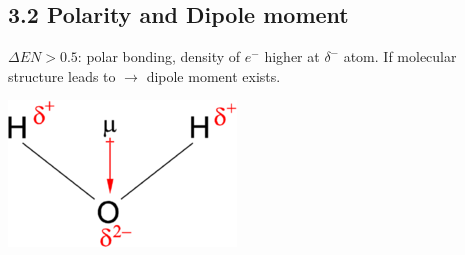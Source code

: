 \subsection{3.2 Polarity and Dipole moment} 
    $\Delta EN>0.5$: polar bonding, density of $e^-$ higher at $\delta^-$ atom.
        If molecular structure leads to  $\rightarrow$ dipole moment exists.
        \begin{center}
            \includegraphics[width=0.3\linewidth]{src/3_Chemical_bondings/images/dipole_moment.png}
        \end{center}